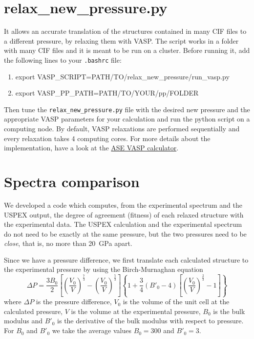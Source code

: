 \documentclass{article}
\begin{document}
\section{relax\_new\_pressure.py}
It allows an accurate translation of the structures contained in many CIF files to a different pressure, by relaxing them with VASP. The script works in a folder with many CIF files and it is meant to be run on a cluster. Before running it, add the following lines to your \texttt{.bashrc} file:
\begin{enumerate}
	\item export VASP\_SCRIPT=PATH/TO/relax\_new\_pressure/run\_vasp.py
	\item export VASP\_PP\_PATH=PATH/TO/YOUR/pp/FOLDER
\end{enumerate}
Then tune the \texttt{relax\_new\_pressure.py} file with the desired new pressure and the appropriate VASP parameters for your calculation and run the python script on a computing node. By default, VASP relaxations are performed sequentially and every relaxation takes 4 computing cores. For more details about the implementation, have a look at the \href{https://wiki.fysik.dtu.dk/ase/ase/calculators/vasp.html}{ASE VASP calculator}.

\appendix
\appendixpage

\section{Spectra comparison}
\label{sec:spectracomp}

We developed a code which computes, from the experimental spectrum and the USPEX output, the degree of agreement (fitness) of each relaxed structure with the experimental data. The USPEX calculation and the experimental spectrum do not need to be exactly at the same pressure, but the two pressures need to be \emph{close}, that is, no more than \SI{20}{GPa} apart.

Since we have a pressure difference, we first translate each calculated structure to the experimental pressure by using the Birch-Murnaghan equation
\begin{equation*}
	\Delta P = \frac{3 B_0}{2} \left[ \left( \frac{V_0}{V} \right)^{\frac{7}{3}} - \left( \frac{V_0}{V} \right)^{\frac{5}{3}} \right] \left\{ 1 + \frac{3}{4} \left( B'_0 - 4 \right) \left[ \left( \frac{V_0}{V} \right)^{\frac{2}{3}} - 1 \right] \right\}
\end{equation*}
where $\Delta P$ is the pressure difference, $V_0$ is the volume of the unit cell at the calculated pressure, $V$ is the volume at the experimental pressure, $B_0$ is the bulk modulus and $B'_0$ is the derivative of the bulk modulus with respect to pressure. For $B_0$ and $B'_0$ we take the average values $B_0 = 300$ and $B'_0 = 3$. 
\end{document}
